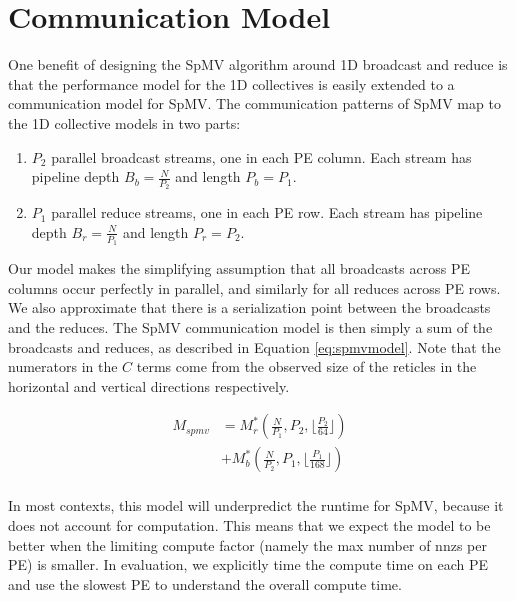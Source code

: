 \documentclass[conference]{IEEEtran}
\begin{document}
\section{Communication Model}
One benefit of designing the SpMV algorithm around 1D broadcast and reduce is that the performance model for the 1D collectives is easily extended to a communication model for SpMV. The communication patterns of SpMV map to the 1D collective models in two parts:
\begin{enumerate}
    \item $P_2$ parallel broadcast streams, one in each PE column. Each stream has pipeline depth $B_b = \frac{N}{P_2}$ and length $P_b = P_1$.
    \item $P_1$ parallel reduce streams, one in each PE row. Each stream has pipeline depth $B_r = \frac{N}{P_1}$ and length $P_r = P_2$.
\end{enumerate}

Our model makes the simplifying assumption that all broadcasts across PE columns occur perfectly in parallel, and similarly for all reduces across PE rows. We also approximate that there is a serialization point between the broadcasts and the reduces. The SpMV communication model is then simply a sum of the broadcasts and reduces, as described in Equation \ref{eq:spmvmodel}. Note that the numerators in the $C$ terms come from the observed size of the reticles in the horizontal and vertical directions respectively.
\begin{tcolorbox}[equationbox,title={SpMV Communication Model}]
    \begin{equation}
        \begin{split}
            M_{spmv} & = M_{r}^*(\frac{N}{P_1}, P_2, \lfloor{\frac{P_2}{64}}\rfloor)   \\
                     & +  M_{b}^*(\frac{N}{P_2}, P_1, \lfloor{\frac{P_1}{168}}\rfloor) \\
        \end{split}
        \label{eq:spmvmodel}
    \end{equation}
\end{tcolorbox}

In most contexts, this model will underpredict the runtime for SpMV, because it does not account for computation. This means that we expect the model to be better when the limiting compute factor (namely the max number of nnzs per PE) is smaller. In evaluation, we explicitly time the compute time on each PE and use the slowest PE to understand the overall compute time.
\end{document}
